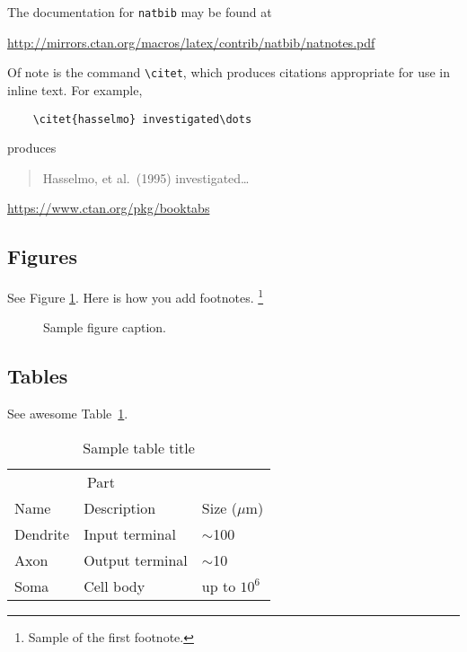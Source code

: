 \documentclass{article}
\begin{document}
	
	The documentation for \verb+natbib+ may be found at
	\begin{center}
		\url{http://mirrors.ctan.org/macros/latex/contrib/natbib/natnotes.pdf}
	\end{center}
	Of note is the command \verb+\citet+, which produces citations
	appropriate for use in inline text.  For example,
	\begin{verbatim}
	\citet{hasselmo} investigated\dots
	\end{verbatim}
	produces
	\begin{quote}
		Hasselmo, et al.\ (1995) investigated\dots
	\end{quote}
	
	\begin{center}
		\url{https://www.ctan.org/pkg/booktabs}
	\end{center}
	
	
	\subsection{Figures}
	See Figure \ref{fig:fig1}. Here is how you add footnotes. \footnote{Sample of the first footnote.}

	
	\begin{figure}
		\centering
		\fbox{\rule[-.5cm]{4cm}{4cm} \rule[-.5cm]{4cm}{0cm}}
		\caption{Sample figure caption.}
		\label{fig:fig1}
	\end{figure}
	
	\subsection{Tables}
	See awesome Table~\ref{tab:table}.
	
	\begin{table}
		\caption{Sample table title}
		\centering
		\begin{tabular}{lll}
			\toprule
			\multicolumn{2}{c}{Part}                   \\
			\cmidrule(r){1-2}
			Name     & Description     & Size ($\mu$m) \\
			\midrule
			Dendrite & Input terminal  & $\sim$100     \\
			Axon     & Output terminal & $\sim$10      \\
			Soma     & Cell body       & up to $10^6$  \\
			\bottomrule
		\end{tabular}
		\label{tab:table}
	\end{table}
	
\end{document}
